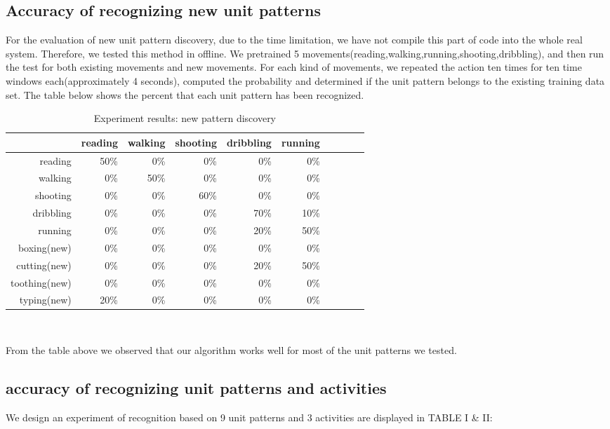 \documentclass[a4paper, 10pt, conference]{IEEEtran}      %
\begin{document}
\subsection{Accuracy of recognizing new unit patterns}
For the evaluation of new unit pattern discovery, due to the time limitation, we have not compile this part of code into the whole real system. Therefore, we tested this method in offline. We pretrained 5 movements(reading,walking,running,shooting,dribbling), and then run the test for both existing movements and new movements. For each kind of movements, we repeated the action ten times for ten time windows each(approximately 4 seconds), computed the probability and determined if the unit pattern belongs to the existing training data set. The table below shows the percent that each unit pattern has been recognized.\par
\begin{table}[htb]
\begin{tabular}{|r|r|r|r|r|r|r|r|r|r|}
  \hline

  \hline 
  \textbf{} & \textbf{reading} &\textbf{walking} & \textbf{shooting} & \textbf{dribbling} & \textbf{running} \\
  \hline
  \hline
   reading &  50\% & 0\% & 0\% & 0\% & 0\% \\
  \hline
   walking &  0\% & 50\% & 0\% & 0\% & 0\% \\
  \hline
   shooting &  0\% & 0\% & 60\% & 0\% & 0\% \\
  \hline
   dribbling &  0\% & 0\% & 0\% & 70\% & 10\% \\
  \hline
   running &  0\% & 0\% & 0\% & 20\% & 50\% \\
  \hline
   boxing(new) &  0\% & 0\% & 0\% & 0\% & 0\% \\
   \hline
   cutting(new) &  0\% & 0\% & 0\% & 20\% & 50\% \\
  \hline
   toothing(new) &  0\% & 0\% & 0\% & 0\% & 0\% \\
  \hline
   typing(new) &  20\% & 0\% & 0\% & 0\% & 0\% \\
    \hline
    
 \end{tabular}
 \\
 \caption{Experiment results: new pattern discovery}   

\end{table}
From the table above we observed that our algorithm works well for most of the unit patterns we tested. 


\subsection{accuracy of recognizing unit patterns and activities}
We design an experiment of recognition based on 9 unit patterns
and 3 activities are displayed in TABLE I \& II: \\
\end{document}
